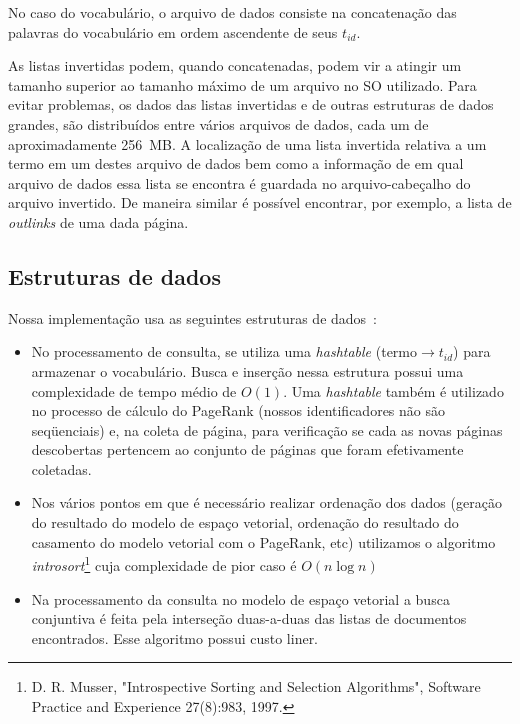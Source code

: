 \documentclass[10pt,twocolumn]{article}
\begin{document}
No caso do vocabulário, o arquivo de dados consiste na concatenação das
palavras do vocabulário em ordem ascendente de seus \(t_{id}\).

As listas invertidas podem, quando concatenadas, podem vir a atingir um tamanho
superior ao tamanho máximo de um arquivo no SO utilizado. Para evitar
problemas, os dados das listas invertidas e de outras estruturas de
dados grandes, são distribuídos entre vários
arquivos de dados, cada um de aproximadamente 256~MB. A localização de
uma lista invertida relativa a um termo em um destes arquivo de dados
bem como a informação de em qual arquivo de dados essa lista se encontra
é guardada no arquivo-cabeçalho do arquivo invertido. De maneira similar
é possível encontrar, por exemplo, a lista de \emph{outlinks} de uma
dada página.

\subsection{Estruturas de dados}\label{sec:datastructures}

Nossa implementação usa as seguintes estruturas de
dados~\cite{cormen-algorithms}:

\begin{itemize}

\item No processamento de consulta, se utiliza uma
\emph{hashtable} (termo\(\rightarrow t_{id}\)) para armazenar o
vocabulário.  Busca e inserção nessa estrutura possui uma complexidade
de tempo médio de \(O\left(1 \right)\). Uma \emph{hashtable} também é
utilizado no processo de cálculo do PageRank (nossos identificadores não
são seqüenciais) e, na coleta de página, para verificação se cada as
novas páginas descobertas pertencem ao conjunto de páginas que foram
efetivamente coletadas.

\item Nos vários pontos em que é necessário realizar ordenação dos dados
(geração do resultado do modelo de espaço vetorial, ordenação do
resultado do casamento do modelo vetorial com o PageRank, etc) utilizamos
o algoritmo \emph{introsort}\footnote{ D. R. Musser,
"Introspective Sorting and Selection Algorithms", Software Practice and
Experience 27(8):983, 1997.  } cuja complexidade de pior caso é
\(O\left(n \log n\right)\)

\item Na processamento da consulta no modelo de espaço vetorial a busca
conjuntiva é feita pela interseção duas-a-duas das listas de documentos
encontrados. Esse algoritmo possui custo liner.

\end{itemize}
\end{document}
